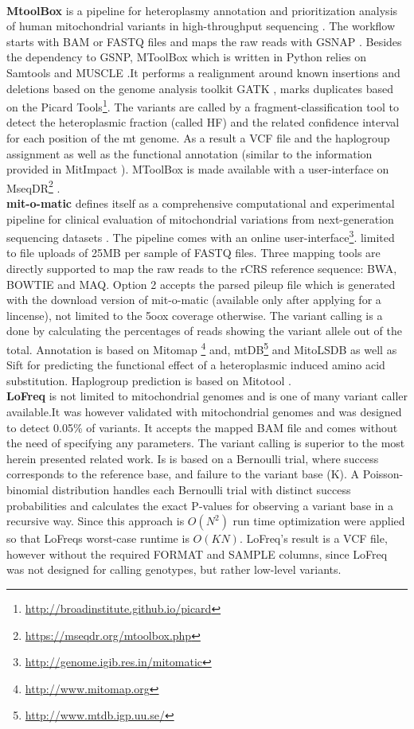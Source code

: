 \\
\textbf{MtoolBox} is a pipeline for heteroplasmy annotation and prioritization analysis of human mitochondrial variants in high-throughput sequencing \cite{Calabrese2014}. The workflow starts with BAM or FASTQ files and maps the raw reads with GSNAP \cite{Wu2010}. Besides the dependency to GSNP, MToolBox which is written in Python relies on Samtools and MUSCLE \cite{Edgar2004}.It performs a realignment around known insertions and deletions based on the genome analysis toolkit GATK \cite{McKenna2010}, marks duplicates based on the Picard Tools\footnote{\url{http://broadinstitute.github.io/picard}}. The variants are called by a fragment-classification tool to detect the heteroplasmic fraction (called HF) and the related confidence interval for each position of the mt genome. As a result a VCF file and the haplogroup assignment as well as the functional annotation (similar to  the information provided in MitImpact \cite{Castellana2014}). MToolBox is made available with a user-interface on MseqDR\footnote{\url{https://mseqdr.org/mtoolbox.php}} \cite{Shen2015} .  
\\
\textbf{mit-o-matic} defines itself as a comprehensive computational and experimental pipeline for clinical evaluation of mitochondrial variations from next-generation sequencing datasets \cite{Vellarikkal2015}. The pipeline comes with an online user-interface\footnote{\url{http://genome.igib.res.in/mitomatic}}. limited to file uploads of 25MB per sample of FASTQ files. Three mapping tools are directly supported to map the raw reads to the rCRS reference sequence: BWA, BOWTIE and MAQ. Option 2 accepts the parsed pileup file which is generated with the download version of mit-o-matic (available only after applying for a lincense), not limited to the 5oox coverage otherwise. The variant calling is a done by calculating the percentages of reads showing the variant allele out of the total. Annotation is based on Mitomap \cite{Lott2013}\footnote{\url{http://www.mitomap.org}} and, mtDB\footnote{\url{http://www.mtdb.igp.uu.se/}} and MitoLSDB\cite{K2013} as well as Sift for predicting the functional effect of a heteroplasmic induced amino acid substitution. Haplogroup prediction is based on Mitotool \cite{Fan2011,Fan2013}. 
\\
\textbf{LoFreq} \cite{Wilm2012} is not limited to mitochondrial genomes and is one of many variant caller available.It was however validated with mitochondrial genomes and was designed to detect 0.05\% of variants. It accepts the mapped BAM file and comes without the need of specifying any parameters. The variant calling is superior to the most herein presented related work. Is is based on a Bernoulli trial, where success corresponds to the reference base, and failure to the variant base (K). A Poisson-binomial distribution handles each Bernoulli trial with distinct success probabilities and calculates the exact P-values for observing a variant base in a recursive way. Since this approach is $O(N^2)$ run time optimization were applied so that LoFreqs worst-case runtime is $O(KN)$. LoFreq's result is a VCF file, however without the required FORMAT and SAMPLE columns, since LoFreq was not designed for calling genotypes, but rather low-level variants.

